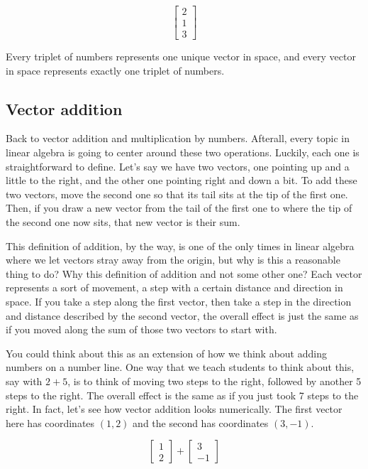 \begin{equation*}
  \begin{bmatrix}
    2 \\
    1 \\
    3
  \end{bmatrix}
\end{equation*}

Every triplet of numbers represents one unique vector in space, and every vector
in space represents exactly one triplet of numbers.

\subsection{Vector addition}

Back to vector addition and multiplication by numbers. Afterall, every topic in
linear algebra is going to center around these two operations. Luckily, each
one is straightforward to define. Let's say we have two vectors, one pointing up
and a little to the right, and the other one pointing right and down a bit. To
add these two vectors, move the second one so that its tail sits at the tip of
the first one. Then, if you draw a new vector from the tail of the first one to
where the tip of the second one now sits, that new vector is their sum.

This definition of addition, by the way, is one of the only times in linear
algebra where we let vectors stray away from the origin, but why is this a
reasonable thing to do? Why this definition of addition and not some other one?
Each vector represents a sort of movement, a step with a certain distance and
direction in space. If you take a step along the first vector, then take a step
in the direction and distance described by the second vector, the overall effect
is just the same as if you moved along the sum of those two vectors to start
with.

You could think about this as an extension of how we think about adding numbers
on a number line. One way that we teach students to think about this, say with
$2 + 5$, is to think of moving two steps to the right, followed by another 5
steps to the right. The overall effect is the same as if you just took 7 steps
to the right. In fact, let's see how vector addition looks numerically. The
first vector here has coordinates $(1, 2)$ and the second has coordinates
$(3, -1)$.

\begin{equation*}
  \begin{bmatrix}
    1 \\
    2
  \end{bmatrix} + \begin{bmatrix}
    3 \\
    -1
  \end{bmatrix}
\end{equation*}

